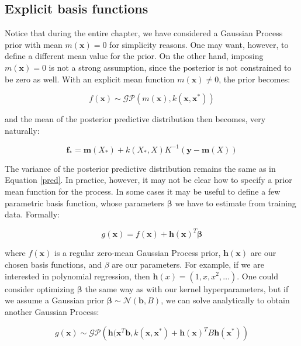 \documentclass[10pt,a4paper,twoside]{book}
\begin{document}
\subsection{Explicit basis functions}

Notice that during the entire chapter, we have considered a Gaussian Process prior with mean $m(\boldsymbol{x}) = 0$ for simplicity reasons. One may want, however, to define a different mean value for the prior. On the other hand, imposing $m(\boldsymbol{x}) = 0$ is not a strong assumption, since the posterior is not constrained to be zero as well. With an explicit mean function $m(\boldsymbol{x}) \neq 0$, the prior becomes:

\begin{equation}
f(\boldsymbol{x}) \sim \mathcal{G}\mathcal{P}\left(m(\boldsymbol{x}), k(\boldsymbol{x}, \boldsymbol{x^*})\right)
\end{equation}

and the mean of the posterior predictive distribution then becomes, very naturally:

\begin{equation}
\boldsymbol{f}_* = \boldsymbol{m}(X_*) + k(X_*, X)K^{-1}\left(\boldsymbol{y} - \boldsymbol{m}(X)\right) 
\end{equation}

The variance of the posterior predictive distribution remains the same as in Equation \ref{pred}. In practice, however, it may not be clear how to specify a prior mean function for the process. In some cases it may be useful to define a few parametric basis function, whose parameters $\boldsymbol{\beta}$ we have to estimate from training data. Formally:

\begin{equation}
\label{gbasis}
g(\boldsymbol{x}) = f(\boldsymbol{x}) + \boldsymbol{h}(\boldsymbol{x})^T\boldsymbol{\beta}
\end{equation}

where $f(\boldsymbol{x})$ is a regular zero-mean Gaussian Process prior, $\boldsymbol{h}(\boldsymbol{x})$ are our chosen basis functions, and $\beta$ are our parameters. For example, if we are interested in polynomial regression, then $\boldsymbol{h}(x) = (1, x, x^2, \dots)$. One could consider optimizing $\boldsymbol{\beta}$ the same way as with our kernel hyperparameters, but if we assume a Gaussian prior $\boldsymbol{\beta} \sim \mathcal{N}(\boldsymbol{b}, B)$, we can solve analytically to obtain another Gaussian Process:

\begin{equation}
g(\boldsymbol{x}) \sim \mathcal{G}\mathcal{P}\left(\boldsymbol{h}(\boldsymbol{x}^T\boldsymbol{b}, k(\boldsymbol{x}, \boldsymbol{x}^*) + \boldsymbol{h}(\boldsymbol{x})^T B \boldsymbol{h}(\boldsymbol{x}^*)\right)
\end{equation} 
\end{document}
